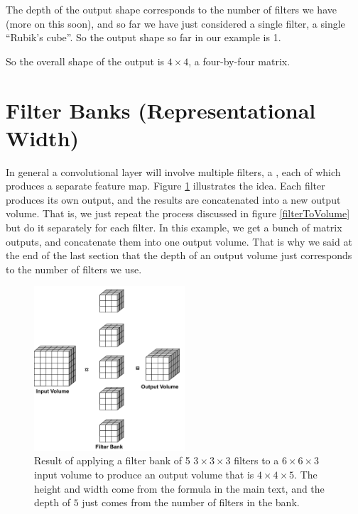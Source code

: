 The depth of the output shape corresponds to the number of filters we have (more on this soon), and so far we have just considered a single filter, a single ``Rubik's cube''. So the output shape so far in our example is 1. 

So the overall shape of the output is $4 \times 4$, a four-by-four matrix.

\section{Filter Banks (Representational Width)}


In general a convolutional layer will involve multiple filters, a , each of which produces a separate feature map.  Figure \ref{filterBank} illustrates the idea. Each filter produces its own output, and the results are concatenated into a new output volume. That is, we just repeat the process discussed in figure \ref{filterToVolume} but do it separately for each filter. In this example, we get a bunch of matrix outputs, and concatenate them into one output volume. That is why we said at the end of the last section that the depth of an output volume just corresponds to the number of filters we use. 

\begin{figure}
\centering
\includegraphics[width=0.5\textwidth]{images/filterBank}
\caption[Soraya Boza and Jeff Yoshimi.]{Result of applying a filter bank of 5 $3 \times 3 \times 3$ filters to a $6 \times 6 \times 3$ input volume to produce an output volume that is $4 \times 4 \times 5$. The height and width come from the formula in the main text, and the depth of $5$ just comes from the number of filters in the bank.}
\label{filterBank}
\end{figure}

